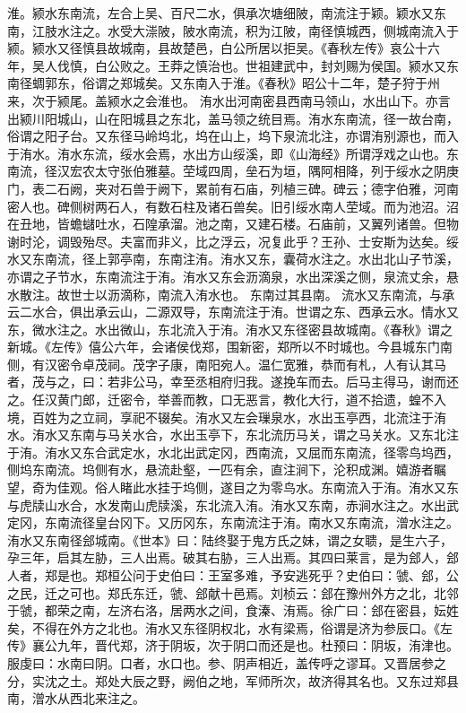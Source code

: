 \documentclass[12pt,UTF8]{ctexbook}
\begin{document}
淮。颍水东南流，左合上吴、百尺二水，俱承次塘细陂，南流注于颖。颖水又东南，江肢水注之。水受大漴陂，陂水南流，积为江陂，南径慎城西，侧城南流入于颍。颍水又径慎县故城南，县故楚邑，白公所居以拒吴。《春秋左传》哀公十六年，吴人伐慎，白公败之。王莽之慎治也。世祖建武中，封刘赐为侯国。颍水又东南径蜩郭东，俗谓之郑城矣。又东南入于淮。《春秋》昭公十二年，楚子狩于州来，次于颍尾。盖颍水之会淮也。
洧水出河南密县西南马领山，水出山下。亦言出颍川阳城山，山在阳城县之东北，盖马领之统目焉。洧水东南流，径一故台南，俗谓之阳子台。又东径马岭坞北，坞在山上，坞下泉流北注，亦谓洧别源也，而入于洧水。洧水东流，绥水会焉，水出方山绥溪，即《山海经》所谓浮戏之山也。东南流，径汉宏农太守张伯雅墓。茔域四周，垒石为垣，隅阿相降，列于绥水之阴庚门，表二石阙，夹对石兽于阙下，累前有石庙，列植三碑。碑云；德字伯雅，河南密人也。碑侧树两石人，有数石柱及诸石兽矣。旧引绥水南人茔域。而为池沼。沼在丑地，皆蟾蠩吐水，石隍承溜。池之南，又建石楼。石庙前，又翼列诸兽。但物谢时沦，调毁殆尽。夫富而非义，比之浮云，况复此乎？王孙、士安斯为达矣。绥水又东南流，径上郭亭南，东南注洧。洧水又东，囊荷水注之。水出北山子节溪，亦谓之子节水，东南流注于洧。洧水又东会沥滴泉，水出深溪之侧，泉流丈余，悬水散注。故世士以沥滴称，南流入洧水也。
东南过其县南。
流水又东南流，与承云二水合，俱出承云山，二源双导，东南流注于洧。世谓之东、西承云水。情水又东，微水注之。水出微山，东北流入于洧。洧水又东径密县故城南。《春秋》谓之新城。《左传》僖公六年，会诸侯伐郑，围新密，郑所以不时城也。今县城东门南侧，有汉密令卓茂祠。茂字子康，南阳宛人。温仁宽雅，恭而有札，人有认其马者，茂与之，曰：若非公马，幸至丞相府归我。遂挽车而去。后马主得马，谢而还之。任汉黄门郎，迁密令，举善而教，口无恶言，教化大行，道不拾遗，蝗不入境，百姓为之立祠，享祀不辍矣。洧水又左会璅泉水，水出玉亭西，北流注于洧水。洧水又东南与马关水合，水出玉亭下，东北流历马关，谓之马关水。又东北注于洧。洧水又东合武定水，水北出武定冈，西南流，又屈而东南流，径零鸟坞西，侧坞东南流。坞侧有水，悬流赴壑，一匹有余，直注涧下，沦积成渊。嬉游者瞩望，奇为佳观。俗人睹此水挂于坞侧，遂目之为零鸟水。东南流入于洧。洧水又东与虎牍山水合，水发南山虎牍溪，东北流入洧。洧水又东南，赤涧水注之。水出武定冈，东南流径皇台冈下。又历冈东，东南流注于洧。南水又东南流，潧水注之。洧水又东南径郐城南。《世本》曰：陆终娶于鬼方氏之妹，谓之女聩，是生六子，孕三年，启其左胁，三人出焉。破其右胁，三人出焉。其四曰莱言，是为郐人，郐人者，郑是也。郑桓公问于史伯曰：王室多难，予安逃死乎？史伯曰：虢、郐，公之民，迁之可也。郑氏东迁，虢、郐献十邑焉。刘桢云：郐在豫州外方之北，北邻于虢，都荣之南，左济右洛，居两水之间，食溱、洧焉。徐广曰：郐在密县，妘姓矣，不得在外方之北也。洧水又东径阴权北，水有梁焉，俗谓是济为参辰口。《左传》襄公九年，晋代郑，济于阴坂，次于阴口而还是也。杜预曰：阴坂，洧津也。服虔曰：水南曰阴。口者，水口也。参、阴声相近，盖传呼之谬耳。又晋居参之分，实沈之土。郑处大辰之野，阙伯之地，军师所次，故济得其名也。又东过郑县南，潧水从西北来注之。
\end{document}

